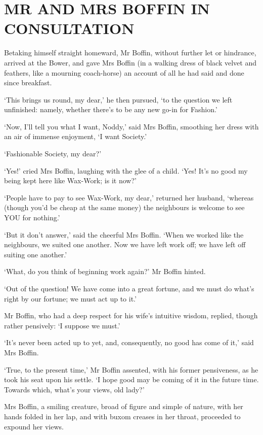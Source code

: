 
\chapter{MR AND MRS BOFFIN IN CONSULTATION}

Betaking himself straight homeward, Mr Boffin, without further let or
hindrance, arrived at the Bower, and gave Mrs Boffin (in a walking dress
of black velvet and feathers, like a mourning coach-horse) an account of
all he had said and done since breakfast.

‘This brings us round, my dear,’ he then pursued, ‘to the question
we left unfinished: namely, whether there’s to be any new go-in for
Fashion.’

‘Now, I’ll tell you what I want, Noddy,’ said Mrs Boffin, smoothing her
dress with an air of immense enjoyment, ‘I want Society.’

‘Fashionable Society, my dear?’

‘Yes!’ cried Mrs Boffin, laughing with the glee of a child. ‘Yes! It’s
no good my being kept here like Wax-Work; is it now?’

‘People have to pay to see Wax-Work, my dear,’ returned her husband,
‘whereas (though you’d be cheap at the same money) the neighbours is
welcome to see YOU for nothing.’

‘But it don’t answer,’ said the cheerful Mrs Boffin. ‘When we worked
like the neighbours, we suited one another. Now we have left work off;
we have left off suiting one another.’

‘What, do you think of beginning work again?’ Mr Boffin hinted.

‘Out of the question! We have come into a great fortune, and we must do
what’s right by our fortune; we must act up to it.’

Mr Boffin, who had a deep respect for his wife’s intuitive wisdom,
replied, though rather pensively: ‘I suppose we must.’

‘It’s never been acted up to yet, and, consequently, no good has come of
it,’ said Mrs Boffin.

‘True, to the present time,’ Mr Boffin assented, with his former
pensiveness, as he took his seat upon his settle. ‘I hope good may be
coming of it in the future time. Towards which, what’s your views, old
lady?’

Mrs Boffin, a smiling creature, broad of figure and simple of nature,
with her hands folded in her lap, and with buxom creases in her throat,
proceeded to expound her views.

